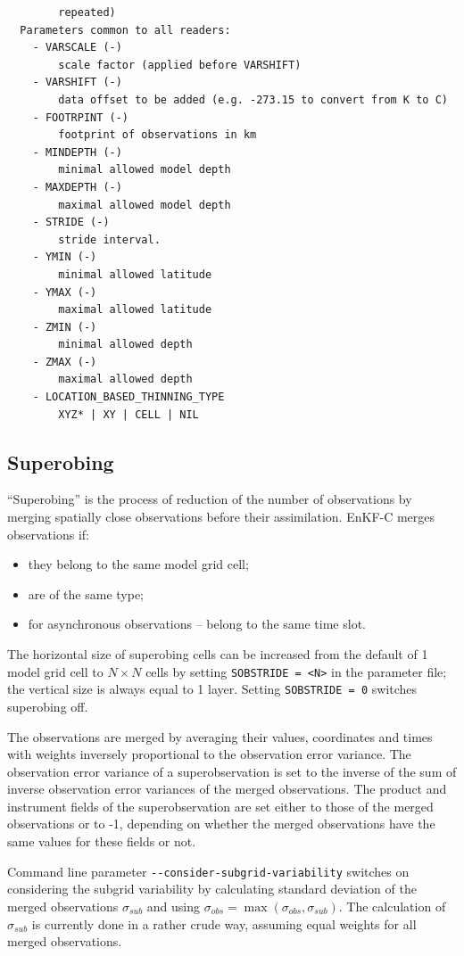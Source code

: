 \documentclass[11pt]{report}
\begin{document}
\begin{Verbatim}
        repeated)
  Parameters common to all readers:
    - VARSCALE (-)
        scale factor (applied before VARSHIFT)
    - VARSHIFT (-)
        data offset to be added (e.g. -273.15 to convert from K to C)
    - FOOTRPINT (-)
        footprint of observations in km
    - MINDEPTH (-)
        minimal allowed model depth
    - MAXDEPTH (-)
        maximal allowed model depth
    - STRIDE (-)
        stride interval.
    - YMIN (-)
        minimal allowed latitude
    - YMAX (-)
        maximal allowed latitude
    - ZMIN (-)
        minimal allowed depth
    - ZMAX (-)
        maximal allowed depth
    - LOCATION_BASED_THINNING_TYPE
        XYZ* | XY | CELL | NIL
\end{Verbatim}

\subsection{Superobing}

``Superobing'' is the process of reduction of the number of observations by merging spatially close observations before their assimilation.
EnKF-C merges observations if:
\begin{itemize}
\item they belong to the same model grid cell;
\item are of the same type;
\item for asynchronous observations -- belong to the same time slot.
\end{itemize}
The horizontal size of superobing cells can be increased from the default of 1 model grid cell to $N \times N$ cells by setting \verb|SOBSTRIDE = <N>| in the parameter file; the vertical size is always equal to 1 layer.
Setting \verb|SOBSTRIDE = 0| switches superobing off.

The observations are merged by averaging their values, coordinates and times with weights inversely proportional to the observation error variance.
The observation error variance of a superobservation is set to the inverse of the sum of inverse observation error variances of the merged observations.
The product and instrument fields of the superobservation are set either to those of the merged observations or to -1, depending on whether the merged observations have the same values for these fields or not.

Command line parameter \verb|--consider-subgrid-variability| switches on considering the subgrid variability by calculating standard deviation of the merged observations $\sigma\!_{sub}$ and using $\sigma\!_{obs} = \max(\sigma\!_{obs}, \sigma\!_{sub})$.
The calculation of $\sigma\!_{sub}$ is currently done in a rather crude way, assuming equal weights for all merged observations.
\end{document}

